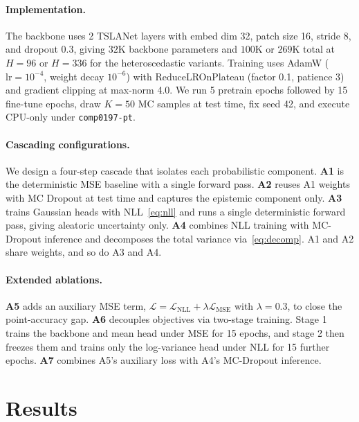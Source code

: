 \documentclass{llncs}
\begin{document}
\paragraph{Implementation.}
The backbone uses 2 TSLANet layers with embed dim 32, patch size 16, stride 8, and dropout 0.3, giving $32$K backbone parameters and $100$K or $269$K total at $H{=}96$ or $H{=}336$ for the heteroscedastic variants. Training uses AdamW ($\text{lr}{=}10^{-4}$, weight decay $10^{-6}$) with ReduceLROnPlateau (factor 0.1, patience 3) and gradient clipping at max-norm 4.0. We run 5 pretrain epochs followed by 15 fine-tune epochs, draw $K{=}50$ MC samples at test time, fix seed 42, and execute CPU-only under \texttt{comp0197-pt}.

\paragraph{Cascading configurations.}
We design a four-step cascade that isolates each probabilistic component. \textbf{A1} is the deterministic MSE baseline with a single forward pass. \textbf{A2} reuses A1 weights with MC Dropout at test time and captures the epistemic component only. \textbf{A3} trains Gaussian heads with NLL~\eqref{eq:nll} and runs a single deterministic forward pass, giving aleatoric uncertainty only. \textbf{A4} combines NLL training with MC-Dropout inference and decomposes the total variance via~\eqref{eq:decomp}. A1 and A2 share weights, and so do A3 and A4.

\paragraph{Extended ablations.}
\textbf{A5} adds an auxiliary MSE term, $\mathcal{L}=\mathcal{L}_{\mathrm{NLL}}+\lambda\mathcal{L}_{\mathrm{MSE}}$ with $\lambda{=}0.3$, to close the point-accuracy gap. \textbf{A6} decouples objectives via two-stage training. Stage 1 trains the backbone and mean head under MSE for 15 epochs, and stage 2 then freezes them and trains only the log-variance head under NLL for 15 further epochs. \textbf{A7} combines A5's auxiliary loss with A4's MC-Dropout inference.

\section{Results}
\label{sec:results}
\end{document}
